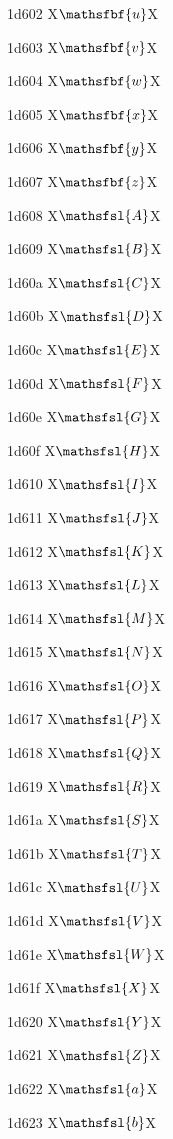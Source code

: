 \documentclass[11pt]{article}
\begin{document}
1d602 X{\ensuremath{\mathsfbf{u}}}X

1d603 X{\ensuremath{\mathsfbf{v}}}X

1d604 X{\ensuremath{\mathsfbf{w}}}X

1d605 X{\ensuremath{\mathsfbf{x}}}X

1d606 X{\ensuremath{\mathsfbf{y}}}X

1d607 X{\ensuremath{\mathsfbf{z}}}X

1d608 X{\ensuremath{\mathsfsl{A}}}X

1d609 X{\ensuremath{\mathsfsl{B}}}X

1d60a X{\ensuremath{\mathsfsl{C}}}X

1d60b X{\ensuremath{\mathsfsl{D}}}X

1d60c X{\ensuremath{\mathsfsl{E}}}X

1d60d X{\ensuremath{\mathsfsl{F}}}X

1d60e X{\ensuremath{\mathsfsl{G}}}X

1d60f X{\ensuremath{\mathsfsl{H}}}X

1d610 X{\ensuremath{\mathsfsl{I}}}X

1d611 X{\ensuremath{\mathsfsl{J}}}X

1d612 X{\ensuremath{\mathsfsl{K}}}X

1d613 X{\ensuremath{\mathsfsl{L}}}X

1d614 X{\ensuremath{\mathsfsl{M}}}X

1d615 X{\ensuremath{\mathsfsl{N}}}X

1d616 X{\ensuremath{\mathsfsl{O}}}X

1d617 X{\ensuremath{\mathsfsl{P}}}X

1d618 X{\ensuremath{\mathsfsl{Q}}}X

1d619 X{\ensuremath{\mathsfsl{R}}}X

1d61a X{\ensuremath{\mathsfsl{S}}}X

1d61b X{\ensuremath{\mathsfsl{T}}}X

1d61c X{\ensuremath{\mathsfsl{U}}}X

1d61d X{\ensuremath{\mathsfsl{V}}}X

1d61e X{\ensuremath{\mathsfsl{W}}}X

1d61f X{\ensuremath{\mathsfsl{X}}}X

1d620 X{\ensuremath{\mathsfsl{Y}}}X

1d621 X{\ensuremath{\mathsfsl{Z}}}X

1d622 X{\ensuremath{\mathsfsl{a}}}X

1d623 X{\ensuremath{\mathsfsl{b}}}X
\end{document}
